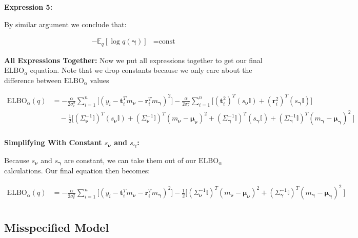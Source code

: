 \documentclass[letterpaper,12pt]{article}
\newcommand{\lb}{\left [} %
\newcommand{\rb}{\right ]} %
\newcommand{\sigmaepsilon}{\sigma_\epsilon^2} %
\newcommand{\nuv}{\boldsymbol{\nu}} %
\newcommand{\gammav}{\boldsymbol{\gamma}} %
\newcommand{\ti}{\boldsymbol{t}_i} %
\newcommand{\ri}{\boldsymbol{r}_i} %
\newcommand{\Sigmanu}{\Sigma_{\nuv}} %
\newcommand{\Sigmagamma}{\Sigma_{\gammav}} %
\newcommand{\snu}{\ensuremath{s_\nuv}} %
\newcommand{\sgamma}{\ensuremath{s_\gammav}} %
\newcommand{\elbo}{\ensuremath{\mathrm{ELBO}}}
\newcommand{\E}{\mathbb{E}_q}
\begin{document}
\textbf{Expression 5:}

By similar argument we conclude that: 

\begin{equation}
\begin{split}
    -   \E \lb \log q(\gammav) \rb &= \textrm{const}
\end{split}
\end{equation}

\textbf{All Expressions Together:} Now we put all expressions together to get our final $\elbo_\alpha$ equation. Note that we drop constants because we only care about the difference between $\elbo_\alpha$ values

\begin{equation}
\begin{split}
    \elbo_\alpha(q) &= -\frac{\alpha}{2 \sigmaepsilon} \sum_{i=1}^n \Bigg[(y_i - \ti^T   m_{\nuv} - \ri^T   m_{\gammav})^2 \Bigg] -\frac{\alpha}{2 \sigmaepsilon} \sum_{i=1}^n \Bigg[ (\ti^2)^T ({\snu} \mathbb{I}) +  (\ri^2)^T ({\sgamma} \mathbb{I}) \Bigg] \\
    & \quad - \frac{1}{2} \Bigg[ (\Sigmanu^{-1} \mathbb{I} )^T (s_{\nuv} \mathbb{I}) + (\Sigmanu^{-1} \mathbb{I} )^T (m_{\nuv}  - \boldsymbol{\mu}_{\nuv} )^2 + (\Sigmagamma^{-1} \mathbb{I} )^T (s_{\gammav} \mathbb{I}) + (\Sigmagamma^{-1} \mathbb{I} )^T (m_{\gammav} - \boldsymbol{\mu}_{\gammav} )^2\ \Bigg] \\
\end{split}
\end{equation}

\noindent \textbf{Simplifying With Constant $s_\nuv$ and $s_\gammav$:}

Because $s_\nuv$ and $s_\gammav$ are constant, we can take them out of our $\elbo_\alpha$ calculations. Our final equation then becomes: 

\begin{equation}
\begin{split}
    \elbo_\alpha(q) &= -\frac{\alpha}{2 \sigmaepsilon} \sum_{i=1}^n \Bigg[(y_i - \ti^T   m_{\nuv} - \ri^T   m_{\gammav})^2 \Bigg] - \frac{1}{2} \Bigg[ (\Sigmanu^{-1} \mathbb{I} )^T (m_{\nuv}  - \boldsymbol{\mu}_{\nuv} )^2 + (\Sigmagamma^{-1} \mathbb{I} )^T (m_{\gammav} - \boldsymbol{\mu}_{\gammav} )^2\ \Bigg] \\
\end{split}
\end{equation}

\subsection{Misspecified Model}
\end{document}
